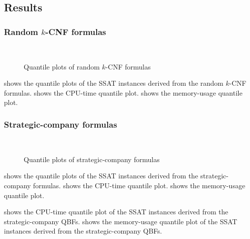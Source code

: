 \subsection{Results}

\subsubsection{Random $k$-CNF formulas}

\begin{figure*}[t]
    \centering
    \\
    \caption{Quantile plots of random $k$-CNF formulas}
    \label{fig:ressat-quantile-random}
\end{figure*}

 shows the quantile plots of the SSAT instances
derived from the random $k$-CNF formulas.
 shows the CPU-time quantile plot.
 shows the memory-usage quantile plot.

\subsubsection{Strategic-company formulas}

\begin{figure*}[t]
    \centering
    \\
    \caption{Quantile plots of strategic-company formulas}
    \label{fig:ressat-quantile-strategic}
\end{figure*}

 shows the quantile plots of the SSAT instances
derived from the strategic-company formulas.
 shows the CPU-time quantile plot.
 shows the memory-usage quantile plot.

 shows the CPU-time quantile plot of the SSAT instances
derived from the strategic-company QBFs.
 shows the memory-usage quantile plot of the SSAT instances
derived from the strategic-company QBFs.